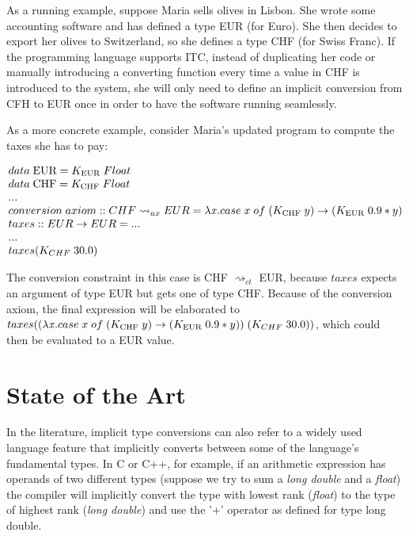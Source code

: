  As a running example, suppose Maria sells olives in Lisbon. She wrote some accounting software and has defined a type EUR (for Euro). She then decides to export her olives to Switzerland, so she defines a type CHF (for Swiss Franc). If the programming language supports ITC, instead of duplicating her code or manually introducing a converting function every time a value in CHF is introduced to the system, she will only need to define an implicit conversion from CFH to EUR once in order to have the software running seamlessly.

 As a more concrete example, consider Maria's updated program to compute the taxes she has to pay:

     \[
\begin{array}{@{\hspace{0mm}}l@{\hspace{0mm}}}
data\;\text{EUR}=K_{\text{EUR}}\;Float\\
data\;\text{CHF}=K_{\text{CHF}}\;Float\\
...\\
conversion\;axiom:: CHF \rightsquigarrow_{ax} EUR = \lambda \tmVar . case\;x\;of\;(K_{\text{CHF}}\;y) \to (K_{\text{EUR}}\;0.9*y)\\
taxes :: EUR \to EUR = ...\\
...\\
taxes (K_{CHF} \; 30.0)
\end{array}
\]

The conversion constraint in this case is CHF $\rightsquigarrow_{ct}$ EUR, because $taxes$ expects an argument of type EUR but gets one of type CHF. Because of the conversion axiom, the final expression will be elaborated to $taxes ((\lambda \mathit{x} . case\;x\;of\;(K_{\text{CHF}}\;y) \to (K_{\text{EUR}}\;0.9*y))\;(K_{CHF} \; 30.0))$, which could then be evaluated to a EUR value.

\section{State of the Art}
\label{sota}
In the literature, implicit type conversions can also refer to a widely used language feature that implicitly converts between some of the language's fundamental types. In C or C++, for example, if an arithmetic expression has operands of two different types (suppose we try to sum a \textit{long double} and a \textit{float}) the compiler will implicitly convert the type with lowest rank (\textit{float}) to the type of highest rank (\textit{long double}) and use the '+' operator as defined for type long double.

